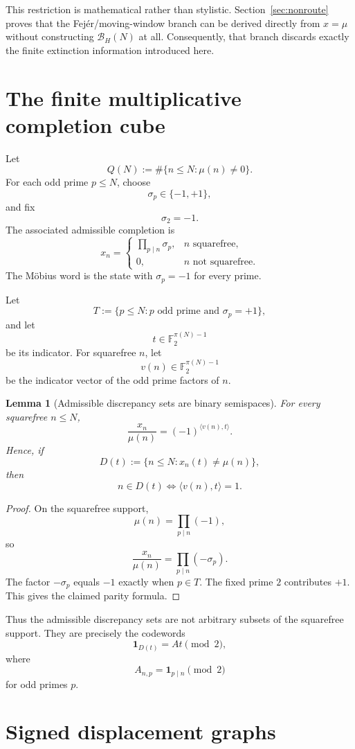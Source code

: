 \documentclass[11pt]{article}
\newtheorem{lemma}[theorem]{Lemma}
\theoremstyle{definition}
\theoremstyle{remark}
\newcommand{\Ftwo}{\mathbb F_2}
\begin{document}
This restriction is mathematical rather than stylistic.  Section~\ref{sec:nonroute} proves that the Fej\'er/moving-window branch can be derived directly from $x=\mu$ without constructing $\mathcal B_H(N)$ at all.  Consequently, that branch discards exactly the finite extinction information introduced here.

\section{The finite multiplicative completion cube}

Let
\[
 Q(N):=\#\{n\le N:\mu(n)\ne0\}.
\]
For each odd prime $p\le N$, choose
\[
 \sigma_p\in\{-1,+1\},
\]
and fix
\[
 \sigma_2=-1.
\]
The associated admissible completion is
\[
 x_n=
 \begin{cases}
 \displaystyle\prod_{p\mid n}\sigma_p,&n\text{ squarefree},\\[1ex]
 0,&n\text{ not squarefree}.
 \end{cases}
\]
The M\"obius word is the state with $\sigma_p=-1$ for every prime.

Let
\[
 T:=\{p\le N:p\text{ odd prime and }\sigma_p=+1\},
\]
and let
\[
 t\in\Ftwo^{\pi(N)-1}
\]
be its indicator.  For squarefree $n$, let
\[
 v(n)\in\Ftwo^{\pi(N)-1}
\]
be the indicator vector of the odd prime factors of $n$.

\begin{lemma}[Admissible discrepancy sets are binary semispaces]\label{lem:semispace}
For every squarefree $n\le N$,
\[
 \frac{x_n}{\mu(n)}=(-1)^{\langle v(n),t\rangle}.
\]
Hence, if
\[
 D(t):=\{n\le N:x_n(t)\ne\mu(n)\},
\]
then
\[
 \boxed{
 n\in D(t)\iff \langle v(n),t\rangle=1.
 }
\]
\end{lemma}

\begin{proof}
On the squarefree support,
\[
 \mu(n)=\prod_{p\mid n}(-1),
\]
so
\[
 \frac{x_n}{\mu(n)}=\prod_{p\mid n}(-\sigma_p).
\]
The factor $-\sigma_p$ equals $-1$ exactly when $p\in T$.  The fixed prime $2$ contributes $+1$.  This gives the claimed parity formula.
\end{proof}

Thus the admissible discrepancy sets are not arbitrary subsets of the squarefree support.  They are precisely the codewords
\[
 \mathbf 1_{D(t)}=At\pmod2,
\]
where
\[
 A_{n,p}=\mathbf1_{p\mid n}\pmod2
\]
for odd primes $p$.

\section{Signed displacement graphs}
\end{document}
